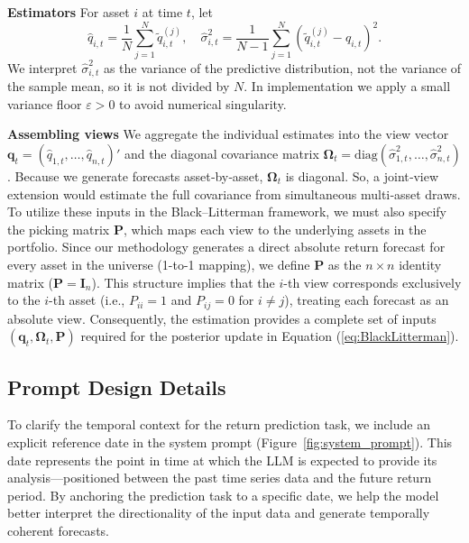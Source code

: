 \textbf{Estimators} For asset $i$ at time $t$, let
\begin{equation}
    \hat{q}_{i, t}=\frac{1}{N} \sum_{j=1}^N \tilde{q}_{i, t}^{(j)}, \quad \hat{\sigma}_{i, t}^2=\frac{1}{N-1} \sum_{j=1}^N\left(\tilde{q}_{i, t}^{(j)}-\hat{q}_{i, t}\right)^2.
\end{equation}
We interpret $\hat{\sigma}^2_{i,t}$ as the variance of the predictive distribution, not the variance of the sample mean, so it is not divided by $N$. In implementation we apply a small variance floor $\varepsilon>0$ to avoid numerical singularity.



\textbf{Assembling views} We aggregate the individual estimates into the view vector $\mathbf{q}_t=(\hat{q}_{1,t},\ldots,\hat{q}_{n,t})'$ and the diagonal covariance matrix $\mathbf{\Omega}_t=\mathrm{diag}(\hat{\sigma}^2_{1,t},\ldots,\hat{\sigma}^2_{n,t})$. 
Because we generate forecasts asset‑by‑asset, $\mathbf{\Omega}_t$ is diagonal. So, a joint‑view extension would estimate the full covariance from simultaneous multi‑asset draws.
To utilize these inputs in the Black–Litterman framework, we must also specify the picking matrix $\mathbf{P}$, which maps each view to the underlying assets in the portfolio. Since our methodology generates a direct absolute return forecast for every asset in the universe (1-to-1 mapping), we define $\mathbf{P}$ as the $n \times n$ identity matrix ($\mathbf{P}=\mathbf{I}_n$).
This structure implies that the $i$-th view corresponds exclusively to the $i$-th asset (i.e., $P_{ii}=1$ and $P_{ij}=0$ for $i \neq j$), treating each forecast as an absolute view.
Consequently, the estimation provides a complete set of inputs $(\mathbf{q}_t, \mathbf{\Omega}_t, \mathbf{P})$ required for the posterior update in Equation (\ref{eq:BlackLitterman}).

\subsection{Prompt Design Details} \label{appendix:prompts}

To clarify the temporal context for the return prediction task, we include an explicit reference date in the system prompt (Figure~\ref{fig:system_prompt}). This date represents the point in time at which the LLM is expected to provide its analysis—positioned between the past time series data and the future return period. By anchoring the prediction task to a specific date, we help the model better interpret the directionality of the input data and generate temporally coherent forecasts.

